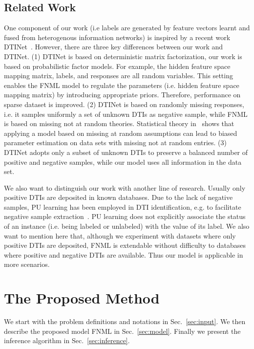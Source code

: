 \documentclass[sigconf,anonymous]{acmart}
\begin{document}
\subsection{Related Work}
One component of our work (i.e labels are generated by feature vectors learnt and fused from heterogenous information networks) is inspired by a recent work DTINet~\cite{Luo2017Network}. However, there are three key differences between our work and DTINet. (1) DTINet is based on deterministic matrix factorization, our work is based on probabilistic factor models. For example, the hidden feature space mapping matrix, labels, and responses are all random variables. This setting enables the FNML model to regulate the parameters (i.e. hidden feature space mapping matrix) by introducing appropriate priors. Therefore, performance on sparse dataset is improved. (2) DTINet is based on randomly missing responses, i.e. it samples uniformly a set of unknown DTIs as negative sample, while FNML is based on missing not at random theories. Statistical theory in~\cite{Little1987Statistical} shows that applying a model based on missing at random assumptions can lead to biased parameter estimation on data sets with missing not at random entries. (3) DTINet adopts only a subset of unknown DTIs to preserve a balanced number of positive and negative samples, while our model uses all information in the data set.

We also want to distinguish our work with another line of research. Usually only positive DTIs are deposited in known databases. Due to the lack of negative samples, PU learning has been employed in DTI identification, e.g. to facilitate negative sample extraction~\cite{Peng2017Screening}. PU learning does not explicitly associate the status of an instance (i.e. being labeled or unlabeled) with the value of its label. We also want to mention here that, although we experiment with datasets where only positive DTIs are deposited, FNML is extendable without difficulty to databases where positive and negative DTIs are available. Thus our model is applicable in more scenarios.



\section{The Proposed Method}\label{sec:method}
We start with the problem definitions and notations in Sec.~\ref{sec:input}. We then describe the proposed model FNML in Sec.~\ref{sec:model}. Finally we present the inference algorithm in Sec.~\ref{sec:inference}.
\end{document}
